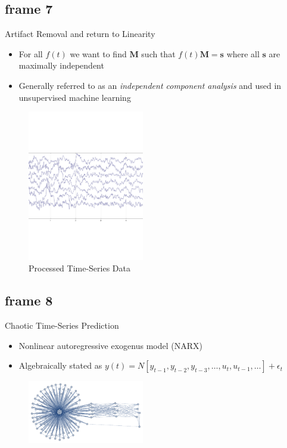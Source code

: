 \documentclass[xcolor=x11names,compress]{beamer}
\renewcommand{\(}{\begin{columns}}
\renewcommand{\)}{\end{columns}}
\newcommand{\<}[1]{\begin{column}{#1}}
\renewcommand{\>}{\end{column}}
\begin{document}
\subsection{frame 7}
\begin{frame}{Artifact Removal and return to Linearity}
\begin{itemize}
\item For all $f(t)$ we want to find $\mathbf{M}$ such that $f(t)\mathbf{M}=\mathbf{s}$ where all $\mathbf{s}$ are maximally independent
\item Generally referred to as an \textit{independent component analysis} and used in unsupervised machine learning
\end{itemize}
\begin{figure}[h]
   \centering
   \includegraphics[width=2in]{Time_Series.pdf}
   \caption{Processed Time-Series Data}
   \label{fig:example}
\end{figure}
\end{frame}


\subsection{frame 8}
\begin{frame}{Chaotic Time-Series Prediction}
\begin{itemize}
\item Nonlinear autoregressive exogenus model (NARX)
\item Algebraically stated as $y(t)  = N[y_{t-1}, y_{t-2}, y_{t-3},\dots,u_{t},u_{t-1}, \dots] +\epsilon_{t}$
\end{itemize}
\begin{figure}[h]
   \centering
   \includegraphics[width=2in]{narx.pdf}
   \label{fig:example}
\end{figure}
\end{frame}
\end{document}
